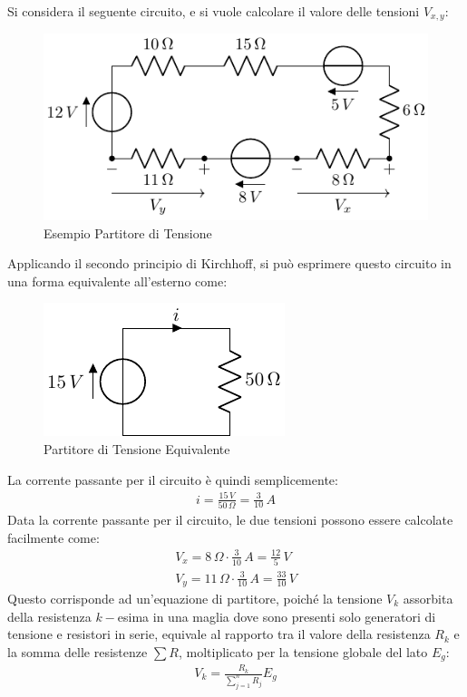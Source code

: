 \documentclass{article}
\numberwithin{equation}{subsection}
\begin{document}
Si considera il seguente circuito, e si vuole calcolare il valore delle tensioni $V_{x,y}$:
\begin{figure}[H]%
    \centering
    \includegraphics{circuito-5.pdf}
    \caption{Esempio Partitore di Tensione}
    \label{fig:circuito-5}
\end{figure}
Applicando il secondo principio di Kirchhoff, si può esprimere questo circuito in una forma equivalente all'esterno come:
\begin{figure}[H]%
    \centering
    \includegraphics{partitore-tensione.pdf}
    \caption{Partitore di Tensione Equivalente}
    \label{fig:partitore-tensione}
\end{figure}
La corrente passante per il circuito è quindi semplicemente:
\begin{gather*}
    i=\displaystyle\frac{15\,V}{50\,\Omega}=\frac{3}{10}\,A
\end{gather*}
Data la corrente passante per il circuito, le due tensioni possono essere calcolate facilmente come:
\begin{gather*}
    V_x=8\,\Omega\cdot \displaystyle\frac{3}{10}\,A=\frac{12}{5}\,V\\
    V_y=11\,\Omega\cdot \displaystyle\frac{3}{10}\,A=\frac{33}{10}\,V
\end{gather*}
Questo corrisponde ad un'equazione di partitore, poiché la tensione $V_k$ assorbita della resistenza $k-$esima in una maglia dove sono presenti solo generatori di tensione 
e resistori in serie, equivale al rapporto tra il valore della resistenza $R_k$ e la somma delle resistenze $\sum R$, moltiplicato per la tensione globale del lato $E_g$:
\begin{gather*}
    V_k=\displaystyle\frac{R_k}{\sum_{j=1}^n R_j}E_g
\end{gather*}
\end{document}
